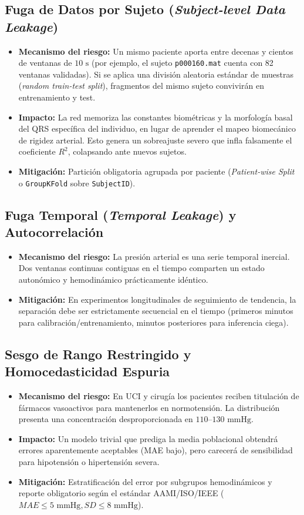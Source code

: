 \documentclass[journal,10pt]{IEEEtran}
\begin{document}
\subsection{Fuga de Datos por Sujeto (\textit{Subject-level Data Leakage})}
\begin{itemize}
    \item \textbf{Mecanismo del riesgo:} Un mismo paciente aporta entre decenas y cientos de ventanas de $10\text{ s}$ (por ejemplo, el sujeto \texttt{p000160.mat} cuenta con 82 ventanas validadas). Si se aplica una división aleatoria estándar de muestras (\textit{random train-test split}), fragmentos del mismo sujeto convivirán en entrenamiento y test.
    \item \textbf{Impacto:} La red memoriza las constantes biométricas y la morfología basal del QRS específica del individuo, en lugar de aprender el mapeo biomecánico de rigidez arterial. Esto genera un sobreajuste severo que infla falsamente el coeficiente $R^2$, colapsando ante nuevos sujetos.
    \item \textbf{Mitigación:} Partición obligatoria agrupada por paciente (\textit{Patient-wise Split} o \texttt{GroupKFold} sobre \texttt{SubjectID}).
\end{itemize}

\subsection{Fuga Temporal (\textit{Temporal Leakage}) y Autocorrelación}
\begin{itemize}
    \item \textbf{Mecanismo del riesgo:} La presión arterial es una serie temporal inercial. Dos ventanas continuas contiguas en el tiempo comparten un estado autonómico y hemodinámico prácticamente idéntico.
    \item \textbf{Mitigación:} En experimentos longitudinales de seguimiento de tendencia, la separación debe ser estrictamente secuencial en el tiempo (primeros minutos para calibración/entrenamiento, minutos posteriores para inferencia ciega).
\end{itemize}

\subsection{Sesgo de Rango Restringido y Homocedasticidad Espuria}
\begin{itemize}
    \item \textbf{Mecanismo del riesgo:} En UCI y cirugía los pacientes reciben titulación de fármacos vasoactivos para mantenerlos en normotensión. La distribución presenta una concentración desproporcionada en $110\text{--}130\text{ mmHg}$.
    \item \textbf{Impacto:} Un modelo trivial que prediga la media poblacional obtendrá errores aparentemente aceptables (MAE bajo), pero carecerá de sensibilidad para hipotensión o hipertensión severa.
    \item \textbf{Mitigación:} Estratificación del error por subgrupos hemodinámicos y reporte obligatorio según el estándar AAMI/ISO/IEEE ($MAE \le 5\text{ mmHg}, SD \le 8\text{ mmHg}$).
\end{itemize}
\end{document}
